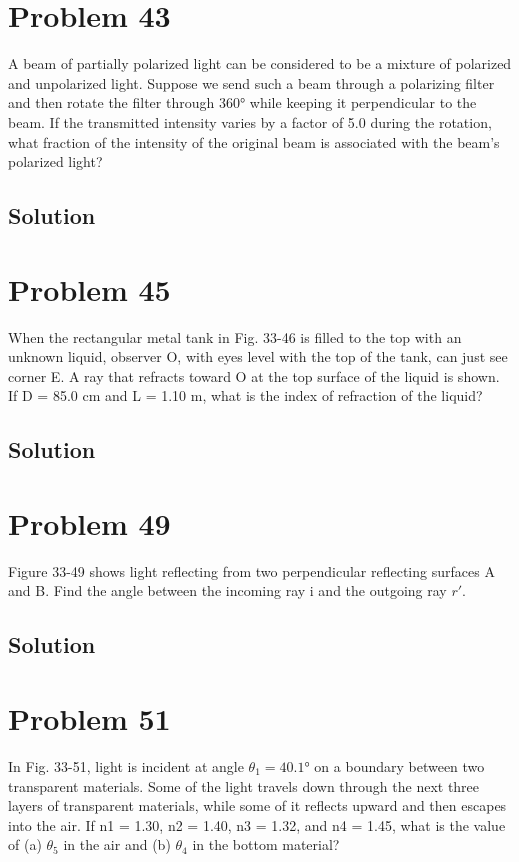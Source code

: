 \documentclass[12pt]{article}
\begin{document}
    \pagebreak
    \section{Problem 43}
        A beam of partially polarized light can be considered to be a mixture of polarized and unpolarized light. 
        Suppose we send such a beam through a polarizing filter and then rotate the filter through 360\unit{\degree} while keeping it perpendicular to the beam. 
        If the transmitted intensity varies by a factor of 5.0 during the rotation, what fraction of the intensity of the original beam is associated with the beam's polarized light?

        \subsection{Solution}

    \pagebreak
    \section{Problem 45}
        When the rectangular metal tank in Fig. 33-46 is filled to the top with an unknown liquid, observer O, with eyes level with the top of the tank, can just see corner E. 
        A ray that refracts toward O at the top surface of the liquid is shown. 
        If D = 85.0 cm and L = 1.10 m, what is the index of refraction of the liquid?

        \subsection{Solution}

    \pagebreak
    \section{Problem 49}
        Figure 33-49 shows light
reflecting from two perpendicular
reflecting surfaces A and B. Find
the angle between the incoming ray
i and the outgoing ray $r'$.

        \subsection{Solution}

    \pagebreak
    \section{Problem 51}
        In Fig. 33-51, light is
incident at angle $\theta_1 = 40.1\unit{\degree}$ on a
boundary between two transparent
materials. Some of the light travels
down through the next three layers
of transparent materials, while some
of it reflects upward and then escapes
into the air. If n1 = 1.30, n2 = 1.40,
n3 = 1.32, and n4 = 1.45, what is the
value of (a) $\theta_5$ in the air and (b) $\theta_4$ in
the bottom material?
\end{document}
